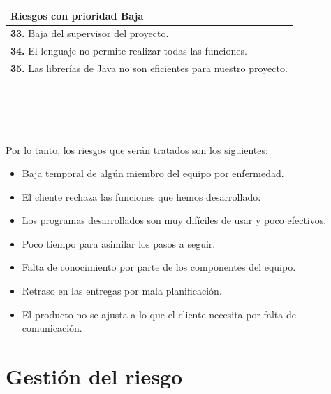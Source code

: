 \documentclass[spanish,a4paper,11pt, twoside]{report}	%
\begin{document}
			\begin{tabular}{|p{12cm}|} 
				\hline
				\textbf{Riesgos con prioridad Baja}\\ \hline \hline
				\textbf{33.} Baja del supervisor del proyecto.\\ \hline 
				\textbf{34.} El lenguaje no permite realizar todas las funciones.\\ \hline
				\textbf{35.} Las librerías de Java no son eficientes para nuestro proyecto. \\ \hline
			\end{tabular}
			\ \\
			\ \\
			\ \\
			\ \\
			Por lo tanto, los riesgos que serán tratados son los siguientes:
			\begin{itemize}
			  \item Baja temporal de algún miembro del equipo por enfermedad.
			  \item El cliente rechaza las funciones que hemos desarrollado.
			  \item Los programas desarrollados son muy difíciles de usar y poco efectivos.
			  \item Poco tiempo para asimilar los pasos a seguir. 
			  \item Falta de conocimiento por parte de los componentes del equipo. 
			  \item Retraso en las entregas por mala planificación. 
			  \item El producto no se ajusta a lo que el cliente necesita por falta de comunicación. 
			\end{itemize}
			

 
\newpage
\mbox{}
\thispagestyle{empty}						%
\newpage
 
\part{Gestión del riesgo}
\end{document}
